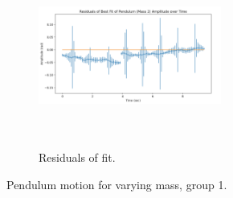 \documentclass[12pt]{article}
\begin{document}
\begin{figure}[h]
\begin{subfigure}[b]{0.48\textwidth}
    \end{subfigure}
    \hfill
    \begin{subfigure}[b]{0.48\textwidth}
        \centering
        \includegraphics[width=6cm,height=6cm, keepaspectratio]{q4b_residuals2.png}
        \caption{Residuals of fit.}

    \end{subfigure}
    \label{fig:q4bfig1}
    \caption{Pendulum motion for varying mass, group 1.}
\end{figure}
\pagebreak
\end{document}
